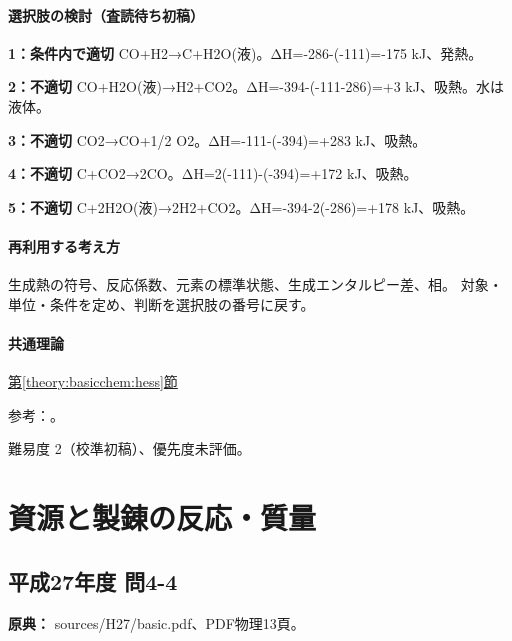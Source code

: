 \paragraph{選択肢の検討（査読待ち初稿）}\mbox{}\par

\noindent\textbf{1：条件内で適切} CO+H2→C+H2O(液)。ΔH=-286-(-111)=-175 kJ、発熱。\par

\noindent\textbf{2：不適切} CO+H2O(液)→H2+CO2。ΔH=-394-(-111-286)=+3 kJ、吸熱。水は液体。\par

\noindent\textbf{3：不適切} CO2→CO+1/2 O2。ΔH=-111-(-394)=+283 kJ、吸熱。\par

\noindent\textbf{4：不適切} C+CO2→2CO。ΔH=\allowbreak{}2(-111)-(-394)=+172 kJ、吸熱。\par

\noindent\textbf{5：不適切} C+2H2O(液)→2H2+CO2。ΔH=-394-2(-286)=+178 kJ、吸熱。\par

\paragraph{再利用する考え方} 生成熱の符号、反応係数、元素の標準状態、生成エンタルピー差、相。 対象・単位・条件を定め、判断を選択肢の番号に戻す。

\paragraph{共通理論} \hyperref[theory:basicchem:hess]{第\ref*{theory:basicchem:hess}節}

\par 参考：\cite{openstax_hess}。

\par 難易度 2（校準初稿）、優先度未評価。

\section{資源と製錬の反応・質量}

\subsection{平成27年度 問4-4}
\label{q:h27-reg-basic-4-4}

\noindent\textbf{原典：} sources/H27/basic.pdf、PDF物理13頁。

